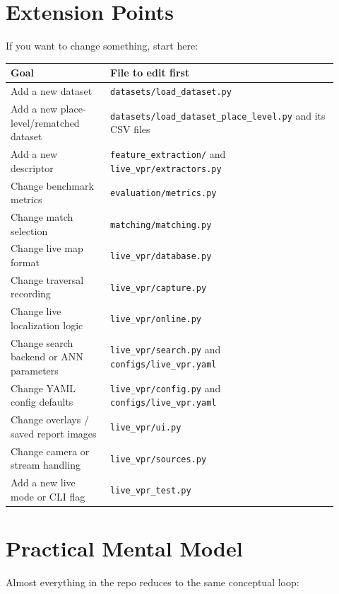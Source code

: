 \documentclass[11pt]{article}
\newcommand{\file}[1]{\texttt{#1}}
\begin{document}
\section{Extension Points}
If you want to change something, start here:

\begin{longtable}{p{0.28\linewidth} p{0.64\linewidth}}
\toprule
\textbf{Goal} & \textbf{File to edit first} \\
\midrule
Add a new dataset & \file{datasets/load\_dataset.py} \\
Add a new place-level/rematched dataset & \file{datasets/load\_dataset\_place\_level.py} and its CSV files \\
Add a new descriptor & \file{feature\_extraction/} and \file{live\_vpr/extractors.py} \\
Change benchmark metrics & \file{evaluation/metrics.py} \\
Change match selection & \file{matching/matching.py} \\
Change live map format & \file{live\_vpr/database.py} \\
Change traversal recording & \file{live\_vpr/capture.py} \\
Change live localization logic & \file{live\_vpr/online.py} \\
Change search backend or ANN parameters & \file{live\_vpr/search.py} and \file{configs/live\_vpr.yaml} \\
Change YAML config defaults & \file{live\_vpr/config.py} and \file{configs/live\_vpr.yaml} \\
Change overlays / saved report images & \file{live\_vpr/ui.py} \\
Change camera or stream handling & \file{live\_vpr/sources.py} \\
Add a new live mode or CLI flag & \file{live\_vpr\_test.py} \\
\bottomrule
\end{longtable}

\section{Practical Mental Model}
Almost everything in the repo reduces to the same conceptual loop:

\begin{center}
\end{center}
\end{document}
